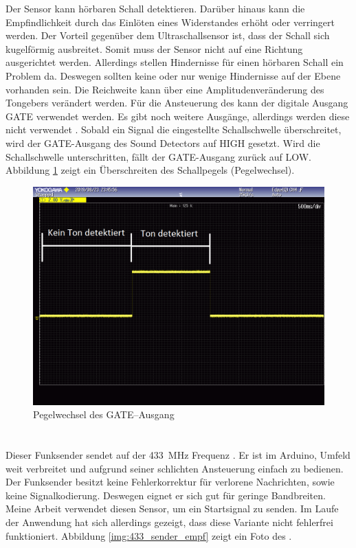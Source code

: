 Der Sensor kann hörbaren Schall detektieren. Darüber hinaus kann die Empfindlichkeit durch das Einlöten eines Widerstandes erhöht oder verringert werden. Der Vorteil gegenüber dem Ultraschallsensor ist, dass der Schall sich kugelförmig ausbreitet. Somit muss der Sensor nicht auf eine Richtung ausgerichtet werden. Allerdings stellen Hindernisse für einen hörbaren Schall ein Problem da. Deswegen sollten keine oder nur wenige Hindernisse auf der Ebene vorhanden sein. Die Reichweite kann über eine Amplitudenveränderung des Tongebers verändert werden. Für die Ansteuerung des \microphone \platz kann der digitale Ausgang \si{GATE} verwendet werden. Es gibt noch weitere Ausgänge, allerdings werden diese nicht verwendet \cite{src_SOUND_DETECTOR}. Sobald ein Signal die eingestellte Schallschwelle überschreitet, wird der \si{GATE}-Ausgang des Sound Detectors auf \si{HIGH} gesetzt. Wird die Schallschwelle unterschritten, fällt der \si{GATE}-Ausgang zurück auf \si{LOW}. Abbildung \ref{img:gate_ausgang} zeigt ein Überschreiten des Schallpegels (Pegelwechsel).
 
\begin{figure}[H]
        \centering
        \includegraphics[width=1\textwidth]{images/gate_ausgang.png}
        \caption{Pegelwechsel des \si{GATE}--Ausgang}
        \label{img:gate_ausgang}
\end{figure}

\paragraph{\funkempfaenger}\mbox{}\\
Dieser Funksender sendet auf der \SI{433}{\mega \hertz} Frequenz \cite{src_433_FUNKSENDER}. Er ist im Arduino, Umfeld weit verbreitet und aufgrund seiner schlichten Ansteuerung einfach zu bedienen. Der Funksender besitzt keine Fehlerkorrektur für verlorene Nachrichten, sowie keine Signalkodierung. Deswegen eignet er sich gut für geringe Bandbreiten. Meine Arbeit verwendet diesen Sensor, um ein Startsignal zu senden. Im Laufe der Anwendung hat sich allerdings gezeigt, dass diese Variante nicht fehlerfrei funktioniert. Abbildung \ref{img:433_sender_empf} zeigt ein Foto des \funkempfaenger.

